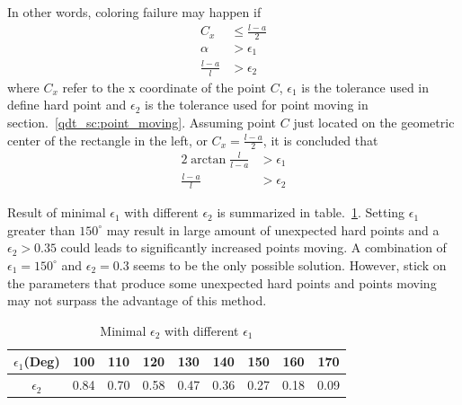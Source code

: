 In other words, coloring failure may happen if
    \begin{equation}
        \begin{aligned}
            C_x  &\leq \frac{l-a}{2} \\
            \alpha &> \epsilon_{1} \\
            \frac{l-a}{l} &> \epsilon_{2}
        \end{aligned}
    \end{equation}
where $C_x$ refer to the x coordinate of the point $C$, $\epsilon_1$ is the tolerance used in define hard point and $\epsilon_2$ is the tolerance used for point moving in section.~\ref{qdt_sc:point_moving}.
Assuming point $C$ just located on the geometric center of the rectangle in the left, or $C_x = \frac{l-a}{2}$, it is concluded that 
    \begin{equation}
        \begin{aligned}
            2 \arctan \frac{l}{l-a} &> \epsilon_1 \\
            \frac{l-a}{l} &> \epsilon_{2}
        \end{aligned}
    \end{equation}

Result of minimal $\epsilon_1$ with different $\epsilon_2$ is summarized in table.~\ref{qdt_tab:qdt_coloring_ep1_ep2}.
Setting $\epsilon_1$ greater than $150^\circ$ may result in large amount of unexpected hard points and a $\epsilon_2 > 0.35$ could leads to significantly increased points moving.
A combination of $\epsilon_1 = 150^\circ$ and $\epsilon_2 = 0.3$ seems to be the only possible solution.
However, stick on the parameters that produce some unexpected hard points and points moving may not surpass the advantage of this method.

    \begin{table}[h!]
        \centering
        \caption{Minimal $\epsilon_2$ with different $\epsilon_1$}
        \label{qdt_tab:qdt_coloring_ep1_ep2}
        \begin{tabular}{ccccccccc}
            \toprule
            $\epsilon_1$(Deg) & 100    & 110      & 120     & 130      & 140     & 150   &   160  &  170   \\
            \midrule    
            $\epsilon_2$ & 0.84 & 0.70 & 0.58 & 0.47 & 0.36 & 0.27 &    0.18 &  0.09\\
            \bottomrule
        \end{tabular}
    \end{table}

